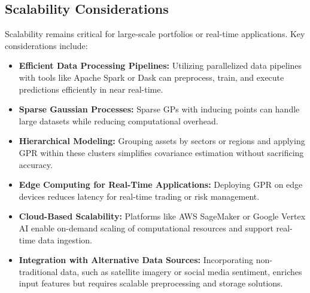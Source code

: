 \subsection{Scalability Considerations}
Scalability remains critical for large-scale portfolios or real-time applications. Key considerations include:

\begin{itemize}
    \item \textbf{Efficient Data Processing Pipelines:} Utilizing parallelized data pipelines with tools like Apache Spark or Dask can preprocess, train, and execute predictions efficiently in near real-time.
    \item \textbf{Sparse Gaussian Processes:} Sparse GPs with inducing points can handle large datasets while reducing computational overhead.
    \item \textbf{Hierarchical Modeling:} Grouping assets by sectors or regions and applying GPR within these clusters simplifies covariance estimation without sacrificing accuracy.
    \item \textbf{Edge Computing for Real-Time Applications:} Deploying GPR on edge devices reduces latency for real-time trading or risk management.
    \item \textbf{Cloud-Based Scalability:} Platforms like AWS SageMaker or Google Vertex AI enable on-demand scaling of computational resources and support real-time data ingestion.
    \item \textbf{Integration with Alternative Data Sources:} Incorporating non-traditional data, such as satellite imagery or social media sentiment, enriches input features but requires scalable preprocessing and storage solutions.
\end{itemize}

